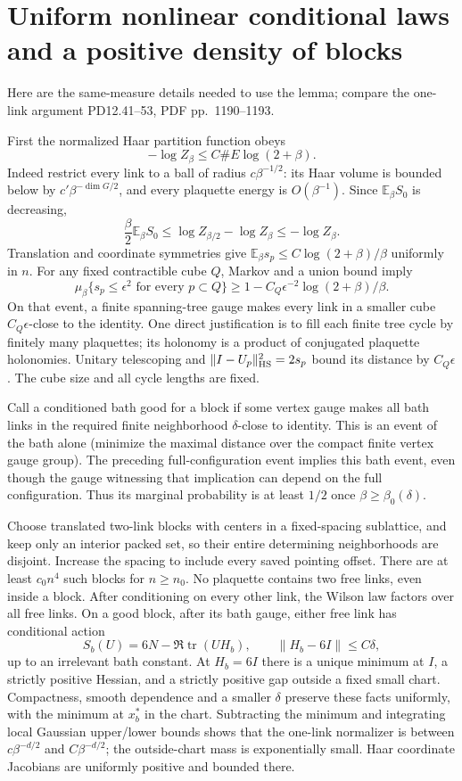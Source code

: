 \documentclass[11pt]{article}
\newcommand{\E}{\mathbb E}
\begin{document}
\section{Uniform nonlinear conditional laws and a positive density of blocks}
Here are the same-measure details needed to use the lemma; compare the
one-link argument PD12.41--53, PDF pp.~1190--1193.

First the normalized Haar partition function obeys
\[
 -\log Z_\beta\le C\#E\log(2+\beta).
\]
Indeed restrict every link to a ball of radius $c\beta^{-1/2}$: its Haar
volume is bounded below by $c'\beta^{-\dim G/2}$, and every plaquette
energy is $O(\beta^{-1})$. Since $\E_\beta S_0$ is decreasing,
\[
 \frac\beta2\E_\beta S_0
 \le\log Z_{\beta/2}-\log Z_\beta\le-\log Z_\beta.
\]
Translation and coordinate symmetries give
$\E_\beta s_p\le C\log(2+\beta)/\beta$ uniformly in $n$.
For any fixed contractible cube $Q$, Markov and a union bound imply
\[
 \mu_\beta\{s_p\le\epsilon^2\text{ for every }p\subset Q\}
 \ge1-C_Q\epsilon^{-2}\log(2+\beta)/\beta.
\]
On that event, a finite spanning-tree gauge makes every link in a smaller
cube $C_Q\epsilon$-close to the identity. One direct justification is to
fill each finite tree cycle by finitely many plaquettes; its holonomy is a
product of conjugated plaquette holonomies. Unitary telescoping and
$\|I-U_p\|_{\rm HS}^2=2s_p$ bound its distance by $C_Q\epsilon$.
The cube size and all cycle lengths are fixed.

Call a conditioned bath good for a block if some vertex gauge makes all
bath links in the required finite neighborhood $\delta$-close to identity.
This is an event of the bath alone (minimize the maximal distance over the
compact finite vertex gauge group). The preceding full-configuration event
implies this bath event, even though the gauge witnessing that implication
can depend on the full configuration. Thus its marginal probability is at
least $1/2$ once $\beta\ge\beta_0(\delta)$.

Choose translated two-link blocks with centers in a fixed-spacing sublattice,
and keep only an interior packed set, so their entire determining
neighborhoods are disjoint. Increase the spacing to include every saved
pointing offset. There are at least $c_0n^4$ such blocks for $n\ge n_0$.
No plaquette contains two free links, even inside a block. After conditioning
on every other link, the Wilson law factors over all free links. On a good
block, after its bath gauge, either free link has conditional action
\[
 S_b(U)=6N-\Re\operatorname{tr}(UH_b),\qquad \|H_b-6I\|\le C\delta,
\]
up to an irrelevant bath constant. At $H_b=6I$ there is a unique minimum
at $I$, a strictly positive Hessian, and a strictly positive gap outside a
fixed small chart. Compactness, smooth dependence and a smaller $\delta$
preserve these facts uniformly, with the minimum at $x_b^*$ in the chart.
Subtracting the minimum and integrating local Gaussian upper/lower bounds
shows that the one-link normalizer is between $c\beta^{-d/2}$ and
$C\beta^{-d/2}$; the outside-chart mass is exponentially small. Haar
coordinate Jacobians are uniformly positive and bounded there.
\end{document}
